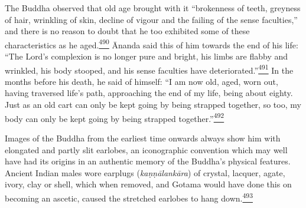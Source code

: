 The Buddha observed that old age brought with it ``brokenness of teeth,
greyness of hair, wrinkling of skin, decline of vigour and the failing
of the sense faculties,'' and there is no reason to doubt that he too
exhibited some of these characteristics as he
aged.\label{footprints_split_013.html_fnref490}\hyperref[footprints_split_025.htmlux5cux23fn490]{\textsuperscript{490}}
Ānanda said this of him towards the end of his life: ``The Lord's
complexion is no longer pure and bright, his limbs are flabby and
wrinkled, his body stooped, and his sense faculties have
deteriorated.''\label{footprints_split_013.html_fnref491}\hyperref[footprints_split_025.htmlux5cux23fn491]{\textsuperscript{491}}
In the months before his death, he said of himself: ``I am now old,
aged, worn out, having traversed life's path, approaching the end of my
life, being about eighty. Just as an old cart can only be kept going by
being strapped together, so too, my body can only be kept going by being
strapped
together.''\label{footprints_split_013.html_fnref492}\hyperref[footprints_split_025.htmlux5cux23fn492]{\textsuperscript{492}}

Images of the Buddha from the earliest time onwards always show him with
elongated and partly slit earlobes, an iconographic convention which may
well have had its origins in an authentic memory of the Buddha's
physical features. Ancient Indian males wore earplugs
(\emph{kaṇṇālankāra}) of crystal, lacquer, agate, ivory, clay or shell,
which when removed, and Gotama would have done this on becoming an
ascetic, caused the stretched earlobes to hang
down.\label{footprints_split_013.html_fnref493}\hyperref[footprints_split_025.htmlux5cux23fn493]{\textsuperscript{493}}

